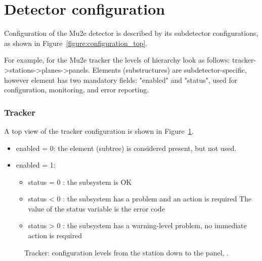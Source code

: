 
\section{Detector configuration}

Configuration of the Mu2e detector is described by its subdetector configurations,
as shown in Figure~\ref{figure:configuration_top}.

For example, for the Mu2e tracker the levels of hierarchy look as follows:
tracker->stations->planes->panels.
Elements (substructures) are subdetector-specific, however element has
two mandatory fields: "enabled" and "status", used for configuration,
monitoring, and error reporting.


\subsubsection{Tracker} 


A top view of the tracker configuration
is shown in Figure~\ref{figure:tracker_config}.
\begin{itemize}
\item
  enabled = 0: the element (subtree) is considered present, but not used.
\item
  enabled = 1:
  \begin{itemize}
  \item
    status = 0 : the subsystem is OK
  \item
    status < 0 : the subsystem has a problem and an action is required
    The value of the status variable is the error code
  \item
    status > 0 : the subsystem has a warning-level problem, no immediate action
    is required
  \end{itemize}
\end{itemize}

\begin{figure}[H]
  \caption{
    \label{figure:tracker_config}
    Tracker: configuration levels from the station down to the panel, .
  }
\end{figure}


